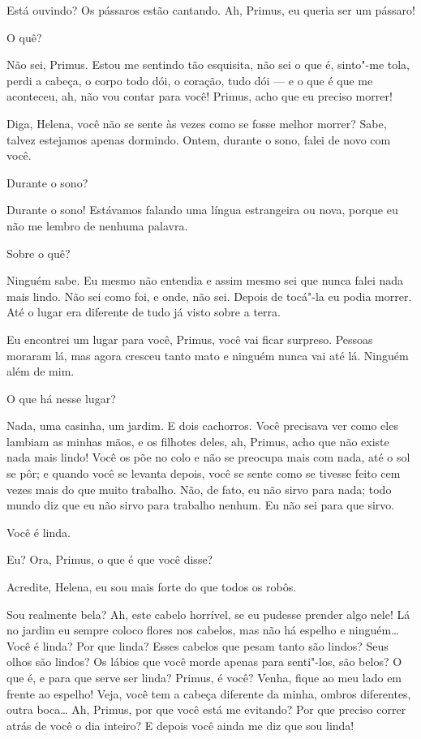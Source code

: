  Está ouvindo? Os pássaros estão cantando. Ah, Primus, eu queria ser um
pássaro!

 O quê?

 Não sei, Primus. Estou me sentindo tão esquisita, não sei o que é,
sinto"-me tola, perdi a cabeça, o corpo todo dói, o coração, tudo dói --- e
o que é que me aconteceu, ah, não vou contar para você! Primus, acho que eu
preciso morrer!

 Diga, Helena, você não se sente às vezes como se fosse melhor morrer?
Sabe, talvez estejamos apenas dormindo. Ontem, durante o sono, falei de novo com
você.

 Durante o sono?

 Durante o sono! Estávamos falando uma língua estrangeira ou nova, porque
eu não me lembro de nenhuma palavra.

 Sobre o quê?

 Ninguém sabe. Eu mesmo não entendia e assim mesmo sei que nunca falei
nada mais lindo. Não sei como foi, e onde, não sei. Depois de tocá"-la eu podia
morrer. Até o lugar era diferente de tudo já visto sobre a terra.

 Eu encontrei um lugar para você, Primus, você vai ficar surpreso. Pessoas moraram
lá, mas agora cresceu tanto mato e ninguém nunca vai até lá. Ninguém além de mim.

 O que há nesse lugar?

 Nada, uma casinha, um jardim. E dois cachorros. Você precisava ver
como eles lambiam as minhas mãos, e os filhotes deles, ah, Primus, acho que não
existe nada mais lindo! Você os põe no colo e não se preocupa mais com nada, até
o sol se pôr; e quando você se levanta depois, você se sente como se tivesse
feito cem vezes mais do que muito trabalho. Não, de fato, eu não sirvo para
nada; todo mundo diz que eu não sirvo para trabalho nenhum. Eu não sei para que sirvo.

 Você é linda.

 Eu? Ora, Primus, o que é que você disse?

 Acredite, Helena, eu sou mais forte do que todos os robôs.

  Sou realmente bela? Ah, este cabelo
horrível, se eu pudesse prender algo nele! Lá no jardim eu
sempre coloco flores nos cabelos, mas não há espelho e ninguém\ldots{}
 Você é linda? Por que linda? Esses
cabelos que pesam tanto são lindos? Seus olhos são lindos? Os
lábios que você morde apenas para senti"-los, são belos? O que é, e para que serve
ser linda?  Primus, é você? Venha, fique ao
meu lado em frente ao espelho! Veja, você tem a cabeça diferente da minha,
ombros diferentes, outra boca\ldots{} Ah, Primus, por que você está me evitando? Por
que preciso correr atrás de você o dia inteiro? E depois você ainda me diz que sou linda!


